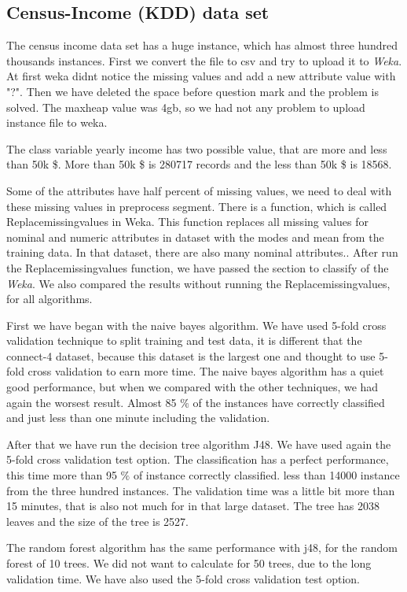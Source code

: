 \documentclass[a4paper]{article}
\begin{document}
\subsection{Census-Income (KDD) data set}

The census income data set has a huge instance, which has almost three hundred
thousands  instances. First we convert the file to csv and try to upload it to
\emph{Weka}. At first weka didnt notice the missing values and add a new
attribute value with "?". Then we have deleted the space before question mark
and the problem is solved. The maxheap value was 4gb, so we had not any problem
to upload instance file to weka. 

The class variable yearly income has two possible value, that are more and less
than 50k \$. More than 50k \$ is 280717 records and the less than 50k \$ is
18568. 

Some of the attributes have half percent of missing values, we need to deal
with these missing values in preprocess segment. There is a function, which is
called Replacemissingvalues in Weka. This function replaces all missing values
for nominal and numeric attributes in dataset with the modes and mean from the
training data. In that dataset, there are also many nominal attributes.. After
run the Replacemissingvalues function, we have passed the section to classify
of the \emph{Weka}.  We also compared the results without running the Replacemissingvalues, for all algorithms.

First we have began with the naive bayes algorithm.  We have used 5-fold cross
validation technique to split training and test data, it is different that the
connect-4 dataset, because this dataset is the largest one and thought to use
5-fold cross validation to earn more time. The naive bayes algorithm has a
quiet good performance, but when we compared with the other techniques, we had
again the worsest result. Almost 85 $\%$ of the instances have correctly
classified and just less than one minute including the validation.

After that we have run the decision tree algorithm J48. We have used again the
5-fold cross validation test option. The classification has a perfect
performance, this time more than 95 $\%$ of instance correctly classified. less
than 14000 instance from the three hundred instances. The validation time was a
little bit more than 15 minutes, that is also not much for in that large
dataset. The tree has 2038 leaves and the size of the tree is 2527. 

The random forest algorithm has the same performance with j48, for the random
forest of 10 trees. We did not want to calculate for 50 trees, due to the long
validation time. We have also used the 5-fold cross validation test option. 
\end{document}
